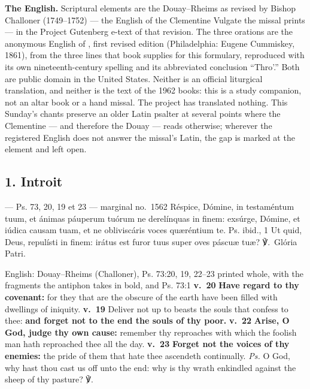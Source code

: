 \textbf{The English.} Scriptural elements are the Douay--Rheims as revised by
Bishop Challoner (1749--1752) --- the English of the Clementine Vulgate the
missal prints --- in the Project Gutenberg e-text of that revision. The three
orations are the anonymous English of , first revised edition
(Philadelphia: Eugene Cummiskey, 1861), from the three lines that book
supplies for this formulary, reproduced with its own nineteenth-century
spelling and its abbreviated conclusion ``Thro'.'' Both are public domain in
the United States. Neither is an official liturgical translation, and neither
is the text of the 1962 books: this is a study companion, not an altar book or
a hand missal. The project has translated nothing. This Sunday's chants
preserve an older Latin psalter at several points where the Clementine ---
and therefore the Douay --- reads otherwise; wherever the registered English
does not answer the missal's Latin, the gap is marked at the element and left
open.

\elementguard
\subsection*{1. Introit }

\begin{appointedlatin}{ --- Ps. 73, 20, 19 et 23 --- marginal no.\ 1562}
Réspice, Dómine, in testaméntum tuum, et ánimas páuperum tuórum ne derelínquas
in finem: exsúrge, Dómine, et iúdica causam tuam, et ne obliviscáris voces
quæréntium te. \textnormal{Ps. ibid., 1} Ut quid, Deus, repulísti in finem:
irátus est furor tuus super oves páscuæ tuæ? ℣.~Glória Patri.
\end{appointedlatin}

\begin{namedtranslation}{English: Douay--Rheims (Challoner), Ps. 73:20, 19, 22--23 printed whole, with the fragments the antiphon takes in bold, and Ps. 73:1}
\textbf{v.~20} \textbf{Have regard to thy covenant:} for they that are the
obscure of the earth have been filled with dwellings of iniquity.
\textbf{v.~19} Deliver not up to beasts the souls that confess to thee:
\textbf{and forget not to the end the souls of thy poor.} \textbf{v.~22}
\textbf{Arise, O God, judge thy own cause:} remember thy reproaches with which
the foolish man hath reproached thee all the day. \textbf{v.~23}
\textbf{Forget not the voices of thy enemies:} the pride of them that hate
thee ascendeth continually. \textit{Ps.} O God, why hast thou cast us off unto
the end: why is thy wrath enkindled against the sheep of thy pasture?
℣.~
\end{namedtranslation}

